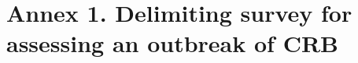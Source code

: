 \documentclass[twocolumn,letterpaper]{scrartcl}
\begin{document}
\section{Annex 1.  Delimiting survey for assessing an outbreak of CRB}
%
%
%
%
%
%
%
%
%
%
%
%
%
%
%
%
%
%
%
%
%
%
%
%
%
%
%
%
%
%
%
%
%
%
%
%
%
%
%
%
%
%
\end{document}
